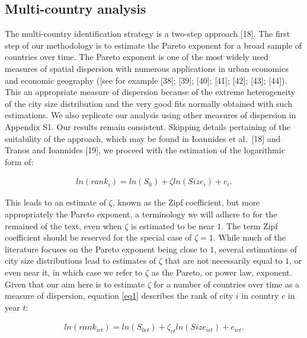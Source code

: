 \documentclass[10pt,letterpaper]{article}
\begin{document}
\hypertarget{sec3.1}{%
\subsection{Multi-country analysis}\label{sec3.1}}

The multi-country identification strategy is a two-step approach
{[}18{]}. The first step of our methodology is to estimate the Pareto
exponent for a broad sample of countries over time. The Pareto exponent
is one of the most widely used measures of spatial dispersion with
numerous applications in urban economics and economic geography ({[}see
for example {[}38{]}; {[}39{]}; {[}40{]}; {[}41{]}; {[}42{]}; {[}43{]};
{[}44{]}). This an appropriate measure of dispersion because of the
extreme heterogeneity of the city size distribution and the very good
fits normally obtained with such estimations. We also replicate our
analysis using other measures of dispersion in Appendix S1. Our results
remain consistent. Skipping details pertaining of the suitability of the
approach, which may be found in Ioannides et al.~{[}18{]} and Tranos and
Ioannides {[}19{]}, we proceed with the estimation of the logarithmic
form of:

\begin{align}
ln(rank_{i}) = ln(S_0) + \zeta ln(Size_i) + e_{i}. \label{eq1}
\end{align}

This leads to an estimate of \(\zeta\), known as the Zipf coefficient,
but more appropriately the Pareto exponent, a terminology we will adhere
to for the remained of the text, even when \(\zeta\) is estimated to be
near \(1\). The term Zipf coefficient should be reserved for the special
case of \(\zeta=1\). While much of the literature focuses on the Pareto
exponent being close to \(1\), several estimations of city size
distributions lead to estimates of \(\zeta\) that are not necessarily
equal to \(1\), or even near it, in which case we refer to \(\zeta\) as
the Pareto, or power law, exponent. Given that our aim here is to
estimate \(\zeta\) for a number of countries over time as a measure of
dispersion, equation \ref{eq1} describes the rank of city \(i\) in
country \(c\) in year \(t\):

\begin{align}
ln(rank_{ict}) = ln(S_{0ct}) + \zeta_{ct} ln(Size_{ict}) + e_{ict}. \label{eq2}
\end{align}
\end{document}
